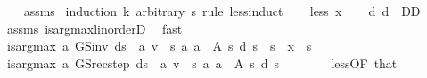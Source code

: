 \begin{isabellebody}
%
\isadelimproof
\ \ %
\endisadelimproof
%
\isatagproof
{}\isamarkupfalse%
\ assms\isanewline
{}\isamarkupfalse%
\ {\isacharparenleft}{\kern0pt}induction\ k\ arbitrary{\isacharcolon}{\kern0pt}\ s\ rule{\isacharcolon}{\kern0pt}\ less{\isacharunderscore}{\kern0pt}induct{\isacharparenright}{\kern0pt}\isanewline
\ \ \isamarkupfalse%
\ {\isacharparenleft}{\kern0pt}less\ x{\isacharparenright}{\kern0pt}\isanewline
\ \ \isamarkupfalse%
\ d{\isacharcolon}{\kern0pt}\ {\isachardoublequoteopen}d\ {\isasymin}\ D\isactrlsub D{\isachardoublequoteclose}\isanewline
\ \ \ \ \isamarkupfalse%
\ assms{\isacharparenleft}{\kern0pt}{}{\isacharparenright}{\kern0pt}\ is{\isacharunderscore}{\kern0pt}arg{\isacharunderscore}{\kern0pt}max{\isacharunderscore}{\kern0pt}linorderD\ \isamarkupfalse%
\ fast\isanewline
\ \ \isamarkupfalse%
\ {\isachardoublequoteopen}is{\isacharunderscore}{\kern0pt}arg{\isacharunderscore}{\kern0pt}max\ {\isacharparenleft}{\kern0pt}{\isasymlambda}a{\isachardot}{\kern0pt}\ GS{\isacharunderscore}{\kern0pt}inv\ {\isacharparenleft}{\kern0pt}d{\isacharparenleft}{\kern0pt}s\ {\isacharcolon}{\kern0pt}{\isacharequal}{\kern0pt}\ a{\isacharparenright}{\kern0pt}{\isacharparenright}{\kern0pt}\ v\ {\isachardollar}{\kern0pt}\ s{\isacharparenright}{\kern0pt}\ {\isacharparenleft}{\kern0pt}{\isasymlambda}a{\isachardot}{\kern0pt}\ a\ {\isasymin}\ A\ s{\isacharparenright}{\kern0pt}\ {\isacharparenleft}{\kern0pt}d\ s{\isacharparenright}{\kern0pt}{\isachardoublequoteclose}\ \ {\isachardoublequoteopen}s\ {\isasymle}\ x{\isachardoublequoteclose}\ \ s\isanewline
\ \ \isamarkupfalse%
\ {\isacharminus}{\kern0pt}\isanewline
\ \ \ \ \isamarkupfalse%
\ {\isachardoublequoteopen}is{\isacharunderscore}{\kern0pt}arg{\isacharunderscore}{\kern0pt}max\ {\isacharparenleft}{\kern0pt}{\isasymlambda}a{\isachardot}{\kern0pt}\ GS{\isacharunderscore}{\kern0pt}rec{\isacharunderscore}{\kern0pt}step\ {\isacharparenleft}{\kern0pt}d{\isacharparenleft}{\kern0pt}s\ {\isacharcolon}{\kern0pt}{\isacharequal}{\kern0pt}\ a{\isacharparenright}{\kern0pt}{\isacharparenright}{\kern0pt}\ v\ {\isachardollar}{\kern0pt}\ s{\isacharparenright}{\kern0pt}\ {\isacharparenleft}{\kern0pt}{\isasymlambda}a{\isachardot}{\kern0pt}\ a\ {\isasymin}\ A\ s{\isacharparenright}{\kern0pt}\ {\isacharparenleft}{\kern0pt}d\ s{\isacharparenright}{\kern0pt}{\isachardoublequoteclose}\isanewline
\ \ \ \ \ \ \isamarkupfalse%
\ less{\isacharparenleft}{\kern0pt}{}{\isacharparenright}{\kern0pt}{\isacharbrackleft}{\kern0pt}OF\ that{\isacharbrackright}{\kern0pt}\isanewline

\end{isabellebody}
